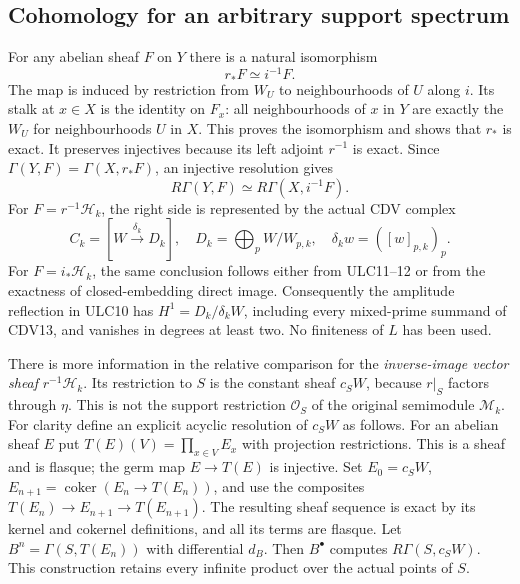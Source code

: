 \subsection{Cohomology for an arbitrary support spectrum}
For any abelian sheaf $F$ on $Y$ there is a natural isomorphism
\begin{equation}\tag{ULC11}
 r_*F\simeq i^{-1}F.
\end{equation}
The map is induced by restriction from $W_U$ to neighbourhoods
of $U$ along $i$. Its stalk at $x\in X$ is the identity on
$F_x$: all neighbourhoods of $x$ in $Y$ are exactly the $W_U$
for neighbourhoods $U$ in $X$. This proves the isomorphism and
shows that $r_*$ is exact. It preserves injectives because its
left adjoint $r^{-1}$ is exact. Since
$\Gamma(Y,F)=\Gamma(X,r_*F)$, an injective resolution gives
\begin{equation}\tag{ULC12}
 R\Gamma(Y,F)\simeq R\Gamma(X,i^{-1}F).
\end{equation}
For $F=r^{-1}\mathcal H_k$, the right side is represented by the
actual CDV complex
\begin{equation}\tag{ULC13}
 C_k=[W\xrightarrow{\delta_k}D_k],\quad
 D_k=\bigoplus_p W/W_{p,k},\quad
 \delta_kw=([w]_{p,k})_p.
\end{equation}
For $F=i_*\mathcal H_k$, the same conclusion follows either
from ULC11--12 or from the exactness of closed-embedding direct
image. Consequently the amplitude reflection in ULC10 has
$H^1=D_k/\delta_kW$, including every mixed-prime summand of
CDV13, and vanishes in degrees at least two. No finiteness of
$L$ has been used.

There is more information in the relative comparison for the
\emph{inverse-image vector sheaf} $r^{-1}\mathcal H_k$.
Its restriction to $S$ is the constant sheaf $c_SW$, because
$r|_S$ factors through $\eta$. This is not the support restriction
$\mathcal O_S$ of the original semimodule $\mathcal M_k$.
For clarity define an explicit acyclic resolution of $c_SW$ as
follows. For an abelian sheaf $E$ put
$T(E)(V)=\prod_{x\in V}E_x$ with projection restrictions.
This is a sheaf and is flasque; the germ map $E\to T(E)$ is
injective. Set $E_0=c_SW$, $E_{n+1}=\operatorname{coker}(E_n\to T(E_n))$,
and use the composites $T(E_n)\to E_{n+1}\to T(E_{n+1})$.
The resulting sheaf sequence is exact by its kernel and cokernel
definitions, and all its terms are flasque. Let $B^n=\Gamma(S,T(E_n))$
with differential $d_B$. Then $B^\bullet$ computes
$R\Gamma(S,c_SW)$. This construction retains every infinite
product over the actual points of $S$.

